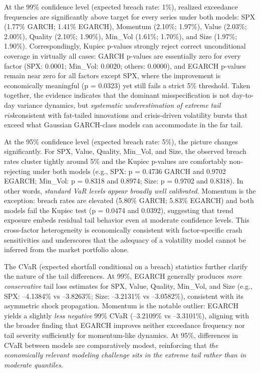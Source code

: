 \documentclass{article}
\begin{document}
At the 99\% confidence level (expected breach rate: 1\%), realized exceedance frequencies are significantly above target for every series under both models: SPX (1.77\% GARCH; 1.41\% EGARCH), Momentum (2.10\%; 1.97\%), Value (2.03\%; 2.00\%), Quality (2.10\%; 1.90\%), Min\_Vol (1.61\%; 1.70\%), and Size (1.97\%; 1.90\%). Correspondingly, Kupiec p-values strongly reject correct unconditional coverage in virtually all cases: GARCH p-values are essentially zero for every factor (SPX: 0.0001; Min\_Vol: 0.0020; others: 0.0000), and EGARCH p-values remain near zero for all factors except SPX, where the improvement is economically meaningful (p = 0.0323) yet still fails a strict 5\% threshold. Taken together, the evidence indicates that the dominant misspecification is not day-to-day variance dynamics, but \emph{systematic underestimation of extreme tail risk}consistent with fat-tailed innovations and crisis-driven volatility bursts that exceed what Gaussian GARCH-class models can accommodate in the far tail.\newline

At the 95\% confidence level (expected breach rate: 5\%), the picture changes significantly. For SPX, Value, Quality, Min\_Vol, and Size, the observed breach rates cluster tightly around 5\% and the Kupiec p-values are comfortably non-rejecting under both models (e.g., SPX: p = 0.4736 GARCH and 0.9702 EGARCH; Min\_Vol: p = 0.8318 and 0.8974; Size: p = 0.9702 and 0.8318). In other words, \emph{standard VaR levels appear broadly well calibrated}. Momentum is the exception: breach rates are elevated (5.80\% GARCH; 5.83\% EGARCH) and both models fail the Kupiec test (p = 0.0474 and 0.0392), suggesting that trend exposure embeds residual tail behavior even at moderate confidence levels. This cross-factor heterogeneity is economically consistent with factor-specific crash sensitivities and underscores that the adequacy of a volatility model cannot be inferred from the market portfolio alone.\newline

The CVaR (expected shortfall conditional on a breach) statistics further clarify the nature of the tail differences. At 99\%, EGARCH generally produces \emph{more conservative} tail loss estimates for SPX, Value, Quality, Min\_Vol, and Size (e.g., SPX: --4.1384\% vs --3.8263\%; Size: --3.2131\% vs --3.0582\%), consistent with its asymmetric shock propagation. Momentum is the notable outlier: EGARCH yields a slightly \emph{less negative} 99\% CVaR (--3.2109\% vs --3.3101\%), aligning with the broader finding that EGARCH improves neither exceedance frequency nor tail severity sufficiently for momentum-like dynamics. At 95\%, differences in CVaR between models are comparatively modest, reinforcing that \emph{the economically relevant modeling challenge sits in the extreme tail rather than in moderate quantiles}. \newline
\end{document}
